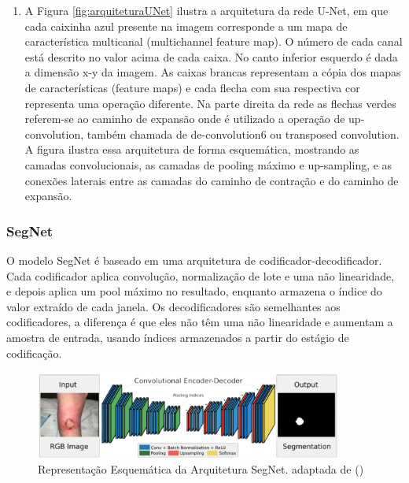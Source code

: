         \begin{enumerate}
            \item A Figura \ref{fig:arquiteturaUNet} ilustra a arquitetura da rede \ac{U-Net}, em que cada caixinha azul presente na imagem corresponde a um mapa de característica multicanal (multichannel feature map). O número de cada canal está descrito no valor acima de cada caixa. No canto inferior esquerdo é dada a dimensão x-y da imagem. As caixas brancas representam a cópia dos mapas de características (feature maps) e cada flecha com sua respectiva cor representa uma operação diferente. Na parte direita da rede as flechas verdes referem-se ao caminho de expansão onde é utilizado a operação de up-convolution, também chamada de de-convolution6 ou transposed convolution. A figura ilustra essa arquitetura de forma esquemática, mostrando as camadas convolucionais, as camadas de pooling máximo e up-sampling, e as conexões laterais entre as camadas do caminho de contração e do caminho de expansão.

        \end{enumerate}

    
    \subsubsection{SegNet}

        O modelo \ac{SegNet} é baseado em uma arquitetura de codificador-decodificador. Cada codificador aplica convolução, normalização de lote e uma não linearidade, e depois aplica um pool máximo no resultado, enquanto armazena o índice do valor extraído de cada janela. Os decodificadores são semelhantes aos codificadores, a diferença é que eles não têm uma não linearidade e aumentam a amostra de entrada, usando índices armazenados a partir do estágio de codificação. 

        \begin{figure}[H]
            \centering
            \includegraphics[width=0.9\textwidth]{img/arquitetura_Seg-Net.png}
            \caption{Representação Esquemática da Arquitetura \ac{SegNet}. adaptada de (\cite{badrinarayanan2017deep})}
            \label{fig:arquiteturaSegNet}
        \end{figure}

